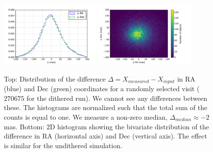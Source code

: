 \documentclass[twocolumn]{aastex62}
\begin{document}
\begin{figure}
  \centering
  \includegraphics[width=0.45\textwidth]{astrometry_single_visit_imsim_dithered_hist}
  \includegraphics[width=0.45\textwidth]{astrometry_single_visit_imsim_dithered_hist2d}
  \caption{Top: Distribution of the difference $\Delta=X_{measured}-X_{input}$ in RA (blue) and Dec
    (green) coordinates for a randomly selected visit ($270675$ for the dithered run). We cannot see
    any differences between these. The histograms are normalized such that the total sum of the
    counts is equal to one. We measure a non-zero median, $\Delta_{median} \approx -2$ mas. Bottom:
    2D histogram showing the bivariate distribution of the difference in RA (horizontal axis) and
    Dec (vertical axis). The effect is similar for the undithered simulation. }
  \label{fig:astrometry_a}
\end{figure}
\end{document}
